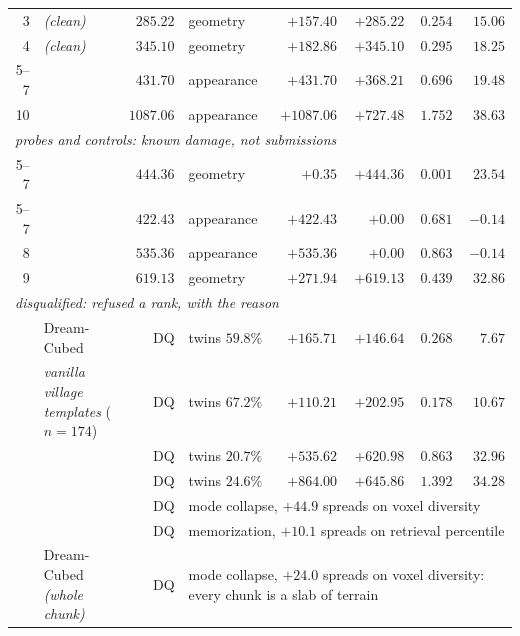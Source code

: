 \begin{table}[t]
\begin{tabular}{rlrlrrrr}
3 & \voxar{} \emph{(clean)}          & $285.22$ & geometry   & $+157.40$ & $+285.22$ & $0.254$ & $15.06$ \\
4 & \voxarun{} \emph{(clean)}        & $345.10$ & geometry   & $+182.86$ & $+345.10$ & $0.295$ & $18.25$ \\
5--7 & \patchstitch{}                & $431.70$ & appearance & $+431.70$ & $+368.21$ & $0.696$ & $19.48$ \\
10 & \randomvox{}                    & $1087.06$ & appearance & $+1087.06$ & $+727.48$ & $1.752$ & $38.63$ \\
\midrule
\multicolumn{8}{l}{\emph{probes and controls: known damage, not submissions}} \\
5--7 & \textbf{\solidify{}}          & $444.36$ & geometry   & $\mathbf{+0.35}$ & $\mathbf{+444.36}$ & $0.001$ & $23.54$ \\
5--7 & \matshuffle{}                 & $422.43$ & appearance & $+422.43$ & $\mathbf{+0.00}$ & $0.681$ & $-0.14$ \\
8 & \monochrome{}                    & $535.36$ & appearance & $+535.36$ & $+0.00$ & $0.863$ & $-0.14$ \\
9 & \copynoise{}                & $619.13$ & geometry   & $+271.94$ & $+619.13$ & $0.439$ & $32.86$ \\
\midrule
\multicolumn{8}{l}{\emph{disqualified: refused a rank, with the reason}} \\
  & Dream-Cubed \citep{merino2026dreamcubed} & DQ & twins $59.8\%$ & $+165.71$ & $+146.64$ & $0.268$ & $7.67$ \\
  & \emph{vanilla village templates} ($n{=}174$) & DQ & twins $67.2\%$ & $+110.21$ & $+202.95$ & $0.178$ & $10.67$ \\
  & \gabled{}                       & DQ & twins $20.7\%$ & $+535.62$ & $+620.98$ & $0.863$ & $32.96$ \\
  & \hollowbox{}                    & DQ & twins $24.6\%$ & $+864.00$ & $+645.86$ & $1.392$ & $34.28$ \\
  & \singlemode{}                    & DQ & \multicolumn{5}{l}{mode collapse, $+44.9$ spreads on voxel diversity} \\
  & \traincopy{}                     & DQ & \multicolumn{5}{l}{memorization, $+10.1$ spreads on retrieval percentile} \\
  & Dream-Cubed \emph{(whole chunk)} & DQ & \multicolumn{5}{l}{mode collapse, $+24.0$ spreads on voxel diversity: every chunk is a slab of terrain} \\
\bottomrule
\end{tabular}
\end{table}

